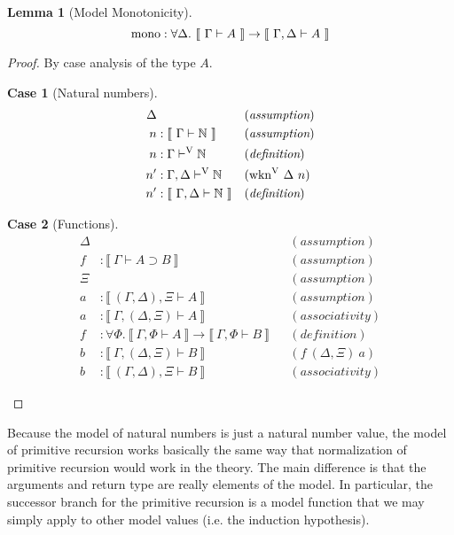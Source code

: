 \documentclass[preprint,nonatbib]{sigplanconf}
\numberwithin{subdefin}{defin}
\theoremstyle{definition}
\numberwithin{subtheorem}{theorem}
\numberwithin{sublemma}{theorem}
\numberwithin{corollary}{theorem}
\numberwithin{case}{theorem}
\numberwithin{slcase}{sublemma}
\newtheorem{scase}{Case}
\numberwithin{scase}{subtheorem}
\newtheorem{lemma}{Lemma}
\numberwithin{lcase}{lemma}
\def\arr{\supset}
\def\marr{\rightarrow}
\def\nat{\mathbb{N}}
\def\mono{\fun{mono}}
\def\bydef{(\textit{definition})}
\def\byass{(\textit{assumption})}
\newcommand{\by}[1]{(#1)}
\newcommand{\turn}[1]{\vdash^\con{#1}}
\newcommand{\all}[1]{\forall#1.~}
\newcommand{\el}[1]{\llbracket ~ #1 ~ \rrbracket}
\newcommand{\wknv}[1]{\fun{wkn}^\con{V} ~ \Delta ~ #1}
\newcommand{\con}[1]{\textmd{#1}}
\newcommand{\fun}[1]{\textmd{#1}}
\newcommand{\typm}[1]{\el{\Gamma \vdash #1}}
\newcommand{\gdtypm}[1]{\el{\Gamma, \Delta \vdash #1}}
\newcommand{\gftypm}[1]{\el{\Gamma, \Phi \vdash #1}}
\newcommand{\typv}[1]{\Gamma \turn{V} #1}
\newcommand{\gdtypv}[1]{\Gamma, \Delta \turn{V} #1}
\begin{document}
\begin{lemma}[Model Monotonicity]
\label{lem:mod:mono}
$$
\mono : \all{\Delta} \typm{A} \marr \gdtypm{A}
$$

\begin{proof}

By case analysis of the type $A$.

\begin{scase}[Natural numbers]
\begin{align*}
\Delta& && \byass\\
n  &: \typm{\nat} && \byass\\
n  &: \typv{\nat} && \bydef\\
n' &: \gdtypv{\nat} && \by{\wknv{n}}\\
n' &: \gdtypm{\nat} && \bydef
\end{align*}
\end{scase}

\begin{scase}[Functions]
\begin{align*}
\Delta& && \byass\\
f  &: \typm{A \arr B} && \byass\\
\Xi& && \byass\\
a  &: \el{(\Gamma, \Delta), \Xi \vdash A} && \byass\\
a  &: \el{\Gamma, (\Delta, \Xi) \vdash A} && \by{associativity}\\
f  &: \all{\Phi} \gftypm{A} \marr \gftypm{B} && \bydef\\
b  &: \el{\Gamma, (\Delta, \Xi) \vdash B} && \by{f~(\Delta,\Xi)~a}\\
b  &: \el{(\Gamma, \Delta), \Xi \vdash B} && \by{associativity}
\end{align*}
\end{scase}

\end{proof}

\end{lemma}

Because the model of natural numbers is just a natural number value,
the model of primitive recursion works basically the same way that
normalization of primitive recursion would work in the theory. The
main difference is that the arguments and return type are really
elements of the model. In particular, the successor branch for the
primitive recursion is a model function that we may simply apply to
other model values (i.e. the induction hypothesis).
\end{document}
